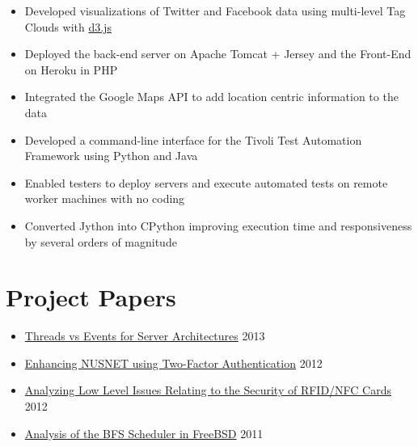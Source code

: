 \documentclass[11pt,a4paper]{moderncv}
\begin{document}
{\begin{itemize}
        \item Developed visualizations of Twitter and Facebook data using multi-level Tag Clouds with \href{http://d3js.org/}{d3.js}
        \item Deployed the back-end server on Apache Tomcat + Jersey and the Front-End on Heroku in PHP
        \item Integrated the Google Maps API to add location centric information to the data
 \end{itemize}}

{\begin{itemize}
        \item Developed a command-line interface for the Tivoli Test Automation Framework using Python and Java
        \item Enabled testers to deploy servers and execute automated tests on remote worker machines with no coding
        \item Converted Jython into CPython improving execution time and responsiveness by several orders of magnitude
 \end{itemize}}
\section{Project Papers}
\begin{itemize}
\item \href{https://github.com/vellvisher/papers_reports/raw/master/Threads_vs_Events_Server_Architectures.pdf}{Threads vs Events for Server Architectures} \hfill 2013
\item \href{https://github.com/vellvisher/papers_reports/raw/master/NUS_2FA_GA.pdf}{Enhancing NUSNET using Two-Factor Authentication} \hfill 2012
\item \href{https://github.com/vellvisher/papers_reports/raw/master/RFID_NFC.pdf}{Analyzing Low Level Issues Relating to the Security of RFID/NFC Cards} \hfill 2012
\item \href{https://github.com/vellvisher/papers_reports/raw/master/BFS_FreeBSD.pdf}{Analysis of the BFS Scheduler in FreeBSD} \hfill 2011
\end{itemize}
\pagebreak
\end{document}
